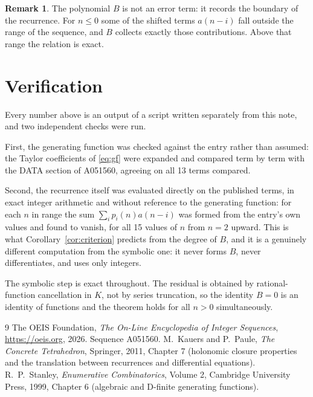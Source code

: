 \documentclass[11pt,a4paper]{article}
\theoremstyle{plain}
\theoremstyle{definition}
\newtheorem{remark}[theorem]{Remark}
\begin{document}
\begin{remark}
The polynomial $B$ is not an error term: it records the boundary of the recurrence. For
$n\le0$ some of the shifted terms $a(n-i)$ fall outside the range of the sequence,
and $B$ collects exactly those contributions. Above that range the relation is exact.
\end{remark}

\section{Verification}

Every number above is an output of a script written separately from this note, and two
independent checks were run.

First, the generating function was checked against the entry rather than assumed: the
Taylor coefficients of \eqref{eq:gf} were expanded and compared term by term with the DATA
section of A051560, agreeing on all 13 terms compared.

Second, the recurrence itself was evaluated directly on the published terms, in exact
integer arithmetic and without reference to the generating function: for each $n$ in range
the sum $\sum_{i}p_{i}(n)a(n-i)$ was formed from the entry's own values and found to
vanish, for all 15 values of $n$ from $n=2$ upward. This is what
Corollary~\ref{cor:criterion} predicts from the degree of $B$, and it is a genuinely
different computation from the symbolic one: it never forms $B$, never differentiates, and
uses only integers.

The symbolic step is exact throughout. The residual is obtained by rational-function
cancellation in $K$, not by series truncation, so the identity $B=0$ is an
identity of functions and the theorem holds for all $n>0$ simultaneously.

\begin{thebibliography}{9}
 The OEIS Foundation, \emph{The On-Line Encyclopedia of Integer Sequences},
\url{https://oeis.org}, 2026. Sequence A051560.
 M.~Kauers and P.~Paule, \emph{The Concrete Tetrahedron}, Springer, 2011,
Chapter 7 (holonomic closure properties and the translation between recurrences and
differential equations).
 R.~P.~Stanley, \emph{Enumerative Combinatorics}, Volume 2, Cambridge
University Press, 1999, Chapter 6 (algebraic and D-finite generating functions).
\end{thebibliography}
\end{document}
